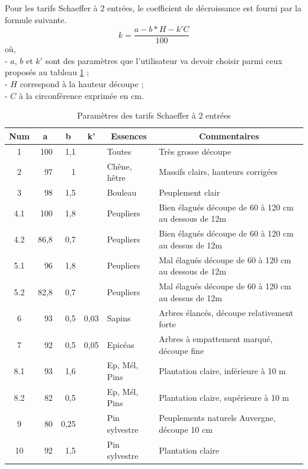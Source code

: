 \documentclass{article}\usepackage[]{graphicx}\usepackage[]{color}
\begin{document}
Pour les tarifs Schaeffer à 2 entrées, le coefficient de décroissance est fourni par la formule suivante.
\begin{displaymath}
k = \frac{a - b*H - k'C}{100}
\end{displaymath}
où, \\
- $ a $, $ b $ et $ k' $ sont des paramètres que l'utilisateur va devoir choisir parmi ceux proposés au tableau \ref{Schaeffer2Param} ;\\
-  $ H $ correspond à la hauteur découpe ;\\
- $ C $ à la circonférence exprimée en cm.\\

\begin{small}
\begin{table}[H]
\begin{tabular}{|c|r|r|r|l|l|}
\hline
\textbf{Num} & \multicolumn{1}{c|}{\textbf{a}} & \multicolumn{1}{c|}{\textbf{b}} & \multicolumn{1}{c|}{\textbf{k'}} & \multicolumn{1}{c|}{\textbf{Essences}} & \multicolumn{1}{c|}{\textbf{Commentaires}} \\ \hline
1 & 100 & 1,1 &   & Toutes & Très grosse découpe \\
2 & 97 & 1 &   & Chêne, hêtre & Massifs clairs, hauteurs corrigées \\
3 & 98 & 1,5 &   & Bouleau & Peuplement clair \\
4.1 & 100 & 1,8 &   & Peupliers & Bien élagués découpe de 60 à 120 cm au dessous de 12m \\
4.2 & 86,8 & 0,7 &   & Peupliers & Bien élagués découpe de 60 à 120 cm au dessus de 12m \\
5.1 & 96 & 1,8 &   & Peupliers & Mal élagués découpe de 60 à 120 cm au dessous de 12m \\
5.2 & 82,8 & 0,7 &   & Peupliers & Mal élagués découpe de 60 à 120 cm au dessus de 12m \\ \hline
6 & 93 & 0,5 & 0,03 & Sapins & Arbres élancés, découpe relativement forte \\
7 & 92 & 0,5 & 0,05 & Epicéas & Arbres à empattement marqué, découpe fine \\
8.1 & 93 & 1,6 &   & Ep, Mél, Pins & Plantation claire, inférieure à 10 m \\
8.2 & 82 & 0,5 &   & Ep, Mél, Pins & Plantation claire, supérieure à 10 m \\
9 & 80 & 0,25 &   & Pin sylvestre & Peuplements naturels Auvergne, découpe 10 cm \\
10 & 92 & 1,5 &   & Pin sylvestre & Plantation claire \\ \hline

\end{tabular}
\caption{Paramètres des tarifs Schaeffer à 2 entrées}
\label{Schaeffer2Param}
\end{table}
\end{small}
\end{document}

